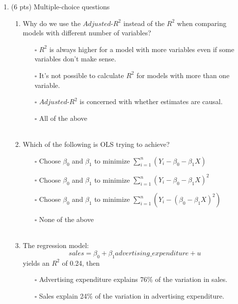 \documentclass{./../../Latex/tests}
\begin{document}
\thispagestyle{plain}
\vspace{0.5em}

\begin{enumerate}
\item (6 pts) Multiple-choice questions 
\begin{enumerate}
\item Why do we use the $Adjusted$-$R^2$ instead of the $R^2$ when comparing models with different number of variables? \\
\begin{enumerate}
	\item[$\square$] $R^2$ is always higher for a model with more variables even if some variables don't make sense.
	\item[$\square$] It's not possible to calculate $R^2$ for models with more than one variable.
	\item[$\square$] $Adjusted$-$R^2$ is concerned with whether estimates are causal.
	\item[$\square$] All of the above \\~\\
\end{enumerate}
\item Which of the following is OLS trying to achieve?
 \begin{enumerate}
	\item[$\square$] Choose $\beta_0$ and $\beta_1$ to minimize $\sum_{i=1}^n (Y_i-\beta_0 -\beta_1 X) $
	\item[$\square$] Choose $\beta_0$ and $\beta_1$ to minimize $\sum_{i=1}^n (Y_i-\beta_0 -\beta_1 X)^2 $
	\item[$\square$] Choose $\beta_0$ and $\beta_1$ to minimize $\sum_{i=1}^n (Y_i-(\beta_0 -\beta_1 X)^2) $
	\item[$\square$] None of the above \\~\\
\end{enumerate}
\item The regression model:
$$ sales = \beta_0 + \beta_1 advertising\_expenditure+u $$
yields an $R^2$ of 0.24, then
\begin{enumerate}
	\item[$\square$] Advertising expenditure explains 76\% of the variation in sales. 
	\item[$\square$] Sales explain 24\% of the variation in advertising expenditure. 

\end{enumerate}
\end{enumerate}
\end{enumerate}
\end{document}
